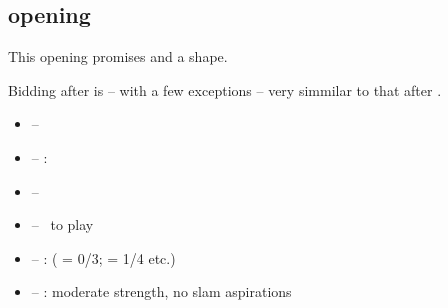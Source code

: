 \subsection{\ctr{2\nt} opening}
\label{subsec:2nt-op}

This opening promises  and a \bal\/ shape.

Bidding after \ctr{2\nt} is -- with a few exceptions -- very simmilar to that after
\hyperref[subsec:1nt-op]{\ctr{1\nt}}. \vspace{1em}

\begin{itemize}
  \item \ctr{3\c} -- \hyperref[subsec:puppet-stayman]{}
  \item \ctr{3\d/\h} -- : 
  \item \ctr{3\s} -- \hyperref[subsec:minor-stayman]{}
  \item \ctr{3\nt} -- \nat\ to play
  \item \ctr{4\c} -- :  ( = 0/3;  = 1/4 etc.)
  \item \ctr{4\d/\h} -- :  moderate strength, no slam aspirations
\end{itemize}
